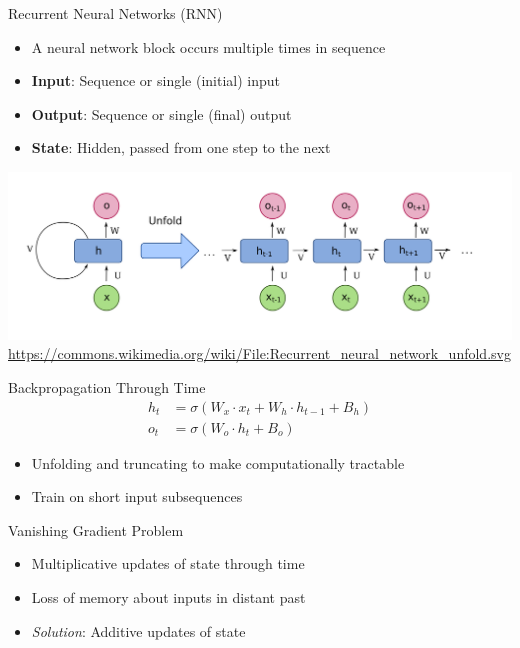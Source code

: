\documentclass[ignorenonframetext,xcolor=x11names]{beamer}
\begin{document}
\begin{frame}{Recurrent Neural Networks (RNN)}
\begin{itemize}
   \item A neural network block occurs multiple times in sequence
   \item \textbf{Input}: Sequence or single (initial) input
   \item \textbf{Output}: Sequence or single (final) output
   \item \textbf{State}: Hidden, passed from one step to the next
\end{itemize}
\centering
\includegraphics[width=\textwidth]{rnn.png}
\scriptsize \url{https://commons.wikimedia.org/wiki/File:Recurrent_neural_network_unfold.svg}
\end{frame}

\begin{frame}{Backpropagation Through Time}
\begin{align*}
h_t &= \sigma ( W_{x} \cdot x_t + W_{h} \cdot h_{t-1} + B_{h}) \\
o_t &= \sigma (W_{o} \cdot h_t + B_{o} ) 
\end{align*}

\begin{itemize}
   \item Unfolding and truncating to make computationally tractable
   \item Train on short input subsequences
\end{itemize}

\begin{block}{Vanishing Gradient Problem}
\begin{itemize}
   \item Multiplicative updates of state through time
   \item Loss of memory about inputs in distant past
   \item \emph{Solution}: Additive updates of state
\end{itemize}
\end{block}
\end{frame}
\end{document}
